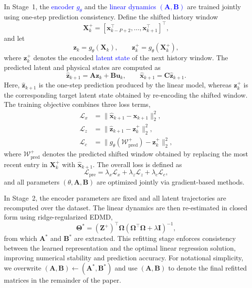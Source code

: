 \documentclass[journal]{IEEEtran}
\newcommand{\vx}{\mathbf{x}}
\newcommand{\vu}{\mathbf{u}}
\newcommand{\vz}{\mathbf{z}}
\newcommand{\mA}{\mathbf{A}}
\newcommand{\mB}{\mathbf{B}}
\newcommand{\mC}{\mathbf{C}}
\newcommand{\mX}{\mathbf{X}}
\newcommand{\mZ}{\mathbf{Z}}
\newcommand{\mI}{\mathbf{I}}
\newcommand{\mTheta}{\boldsymbol{\Theta}}
\newcommand{\mOmega}{\boldsymbol{\Omega}}
\begin{document}
In Stage~1, the \textcolor{blue}{encoder $g_\theta$} and the \textcolor{blue}{linear dynamics $(\mA,\mB)$}
are trained jointly using one-step prediction consistency. Define the
shifted history window
\begin{equation}
    \mX_k^{+} = [\vx_{k-P+2}^\top,\ldots,\vx_{k+1}^\top]^\top,
\end{equation}
and let
\begin{equation}
    \vz_k = g_\theta(\mX_k), \qquad
    \vz_k^{+} = g_\theta(\mX_k^{+}),
\end{equation}
where $\vz_k^{+}$ denotes the encoded \textcolor{blue}{latent state} of the next history
window. The predicted latent and physical states are computed as
\begin{equation}
    \hat{\vz}_{k+1} = \mA \vz_k + \mB \vu_k,
    \qquad
    \hat{\vx}_{k+1} = \mC \hat{\vz}_{k+1}.
\end{equation}
Here, $\hat{\vz}_{k+1}$ is the one-step prediction produced by the
linear model, whereas $\vz_k^{+}$ is the corresponding target latent
state obtained by re-encoding the shifted window. The training objective
combines three loss terms,
\begin{align}
    \mathcal{L}_{x} &= \|\hat{\vx}_{k+1}-\vx_{k+1}\|_2^2,
    \label{eq:loss_x}\\
    \mathcal{L}_{z} &= \|\hat{\vz}_{k+1}-\vz_k^{+}\|_2^2,
    \label{eq:loss_z}\\
    \mathcal{L}_{c} &=
    \bigl\|g_\theta(\mathcal{W}^{+}_{\mathrm{pred}})-\vz_k^{+}\bigr\|_2^2,
    \label{eq:loss_c}
\end{align}
where $\mathcal{W}^{+}_{\mathrm{pred}}$ denotes the predicted shifted
window obtained by replacing the most recent entry in $\mX_k^{+}$ with
$\hat{\vx}_{k+1}$. The overall loss is defined as
\begin{equation}
    \mathcal{L}_{\mathrm{pre}} =
    \lambda_x \mathcal{L}_x + \lambda_z \mathcal{L}_z
    + \lambda_c \mathcal{L}_c,
    \label{eq:pretraining_loss}
\end{equation}
and all parameters $(\theta, \mA, \mB)$ are optimized jointly via
gradient-based methods.

In Stage~2, the encoder parameters are fixed and all latent trajectories
are recomputed over the dataset. The linear dynamics are then
re-estimated in closed form using ridge-regularized EDMD,
\begin{equation}
    \mTheta^{*} = (\mZ^{+})^\top \mOmega
    \left(\mOmega^\top \mOmega + \lambda \mI\right)^{-1},
\end{equation}
from which $\mA^{*}$ and $\mB^{*}$ are extracted. This refitting stage
enforces consistency between the learned representation and the optimal
linear regression solution, improving numerical stability and prediction
accuracy. For notational simplicity, we overwrite
$(\mA,\mB)\leftarrow(\mA^{*},\mB^{*})$ and use $(\mA,\mB)$ to denote
the final refitted matrices in the remainder of the paper.
\end{document}
